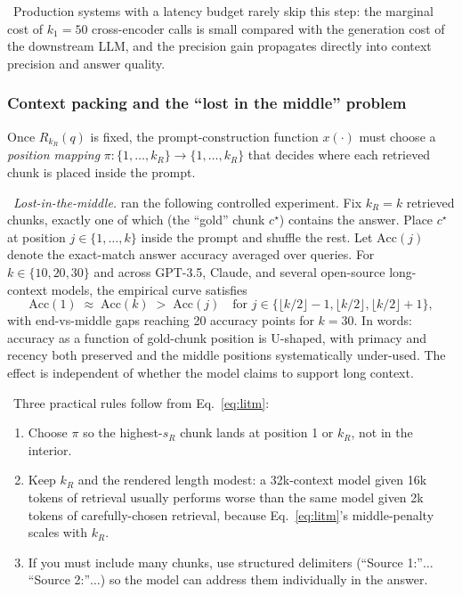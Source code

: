 \Cons\ Production systems with a latency budget rarely skip this
step: the marginal cost of $k_1 = 50$ cross-encoder calls is small
compared with the generation cost of the downstream LLM, and the
precision gain propagates directly into context precision and
answer quality.

\subsubsection{Context packing and the ``lost in the middle'' problem}

Once $R_{k_R}(q)$ is fixed, the prompt-construction function
$x(\cdot)$ must choose a \emph{position mapping}
$\pi : \{1, \dots, k_R\} \to \{1, \dots, k_R\}$ that decides where
each retrieved chunk is placed inside the prompt.

\Emp\ \emph{Lost-in-the-middle.} \citet{liu2024lost} ran the
following controlled experiment. Fix $k_R = k$ retrieved chunks,
exactly one of which (the ``gold'' chunk $c^\star$) contains the
answer. Place $c^\star$ at position $j \in \{1, \dots, k\}$ inside
the prompt and shuffle the rest. Let $\mathrm{Acc}(j)$ denote the
exact-match answer accuracy averaged over queries. For
$k \in \{10, 20, 30\}$ and across GPT-3.5, Claude, and several
open-source long-context models, the empirical curve satisfies
\begin{equation}
  \mathrm{Acc}(1) \;\approx\; \mathrm{Acc}(k) \;>\; \mathrm{Acc}(j)
  \quad \text{for } j \in \{\lfloor k/2 \rfloor - 1, \lfloor k/2
  \rfloor, \lfloor k/2 \rfloor + 1\},
  \label{eq:litm}
\end{equation}
with end-vs-middle gaps reaching 20 accuracy points for $k = 30$.
In words: accuracy as a function of gold-chunk position is
U-shaped, with primacy and recency both preserved and the middle
positions systematically under-used. The effect is independent of
whether the model claims to support long context.

\Cons\ Three practical rules follow from Eq.~\eqref{eq:litm}:
\begin{enumerate}
  \item Choose $\pi$ so the highest-$s_R$ chunk lands at position 1
        or $k_R$, not in the interior.
  \item Keep $k_R$ and the rendered length modest: a 32k-context
        model given 16k tokens of retrieval usually performs worse
        than the same model given 2k tokens of carefully-chosen
        retrieval, because Eq.~\eqref{eq:litm}'s middle-penalty
        scales with $k_R$.
  \item If you must include many chunks, use structured
        delimiters (``Source 1:''$\dots$``Source 2:''$\dots$) so the
        model can address them individually in the answer.
\end{enumerate}


